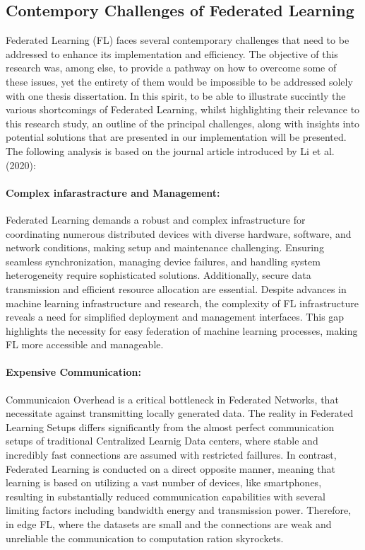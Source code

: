 \subsection{Contempory Challenges of Federated Learning}
Federated Learning (FL) faces several contemporary challenges that need to be addressed to enhance its implementation and efficiency.
The objective of this research was, among else, to provide a pathway on how to overcome some of these issues, yet the entirety of them
would be impossible to be addressed solely with one thesis dissertation. In this spirit,
to be able to illustrate succintly the various shortcomings of Federated Learning, whilst highlighting their relevance to this
research study, an outline of the principal challenges, along with insights into potential solutions that are
presented in our implementation will be presented. The following analysis is based on the journal article introduced by
Li et al.\cite{liFederatedLearningChallenges2020} (2020):
\paragraph{Complex infarastracture and Management:} Federated Learning demands a robust and complex infrastructure for coordinating numerous
distributed devices with diverse hardware, software, and network conditions, making setup and maintenance challenging. Ensuring seamless synchronization,
managing device failures, and handling system heterogeneity require sophisticated solutions. Additionally, secure data transmission and efficient
resource allocation are essential. Despite advances in machine learning infrastructure and research, the complexity of FL infrastructure reveals a need
for simplified deployment and management interfaces. This gap highlights the necessity for easy federation of machine learning processes, making FL more
accessible and manageable.
\paragraph{Expensive Communication:} Communicaion Overhead is a critical bottleneck in Federated Networks, that necessitate against
transmitting locally generated data. The reality in Federated Learning Setups differs significantly from the almost perfect communication
setups of traditional Centralized Learnig Data centers, where stable and incredibly fast connections are assumed with restricted faillures.
In contrast, Federated Learning is conducted on a direct opposite manner, meaning that learning is based on utilizing a vast number of
devices, like smartphones, resulting in substantially reduced communication capabilities with several limiting factors including bandwidth
energy and transmission power. Therefore, in edge FL, where the datasets are small and the connections are weak and unreliable the communication
to computation ration skyrockets.
